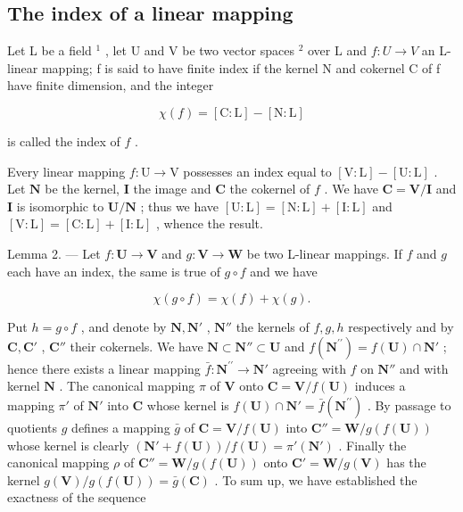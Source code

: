 \subsection{The index of a linear mapping}

Let L be a field \(^{1}\) , let U and V be two vector spaces \(^{2}\) over L and \(f: U \to V\) an L-linear mapping; f is said to have finite index if the kernel N and cokernel C of f have finite dimension, and the integer

\[
\chi (f) = [ \mathrm{C}: \mathrm{L} ] - [ \mathrm{N}: \mathrm{L} ]
\]

is called the index of \(f\) .

Every linear mapping \(f: \mathrm{U} \to \mathrm{V}\) possesses an index equal to \([\mathrm{V}: \mathrm{L}] - [\mathrm{U}: \mathrm{L}]\) . Let \(\mathbf{N}\) be the kernel, \(\mathbf{I}\) the image and \(\mathbf{C}\) the cokernel of \(f\) . We have \(\mathbf{C} = \mathbf{V} / \mathbf{I}\) and \(\mathbf{I}\) is isomorphic to \(\mathbf{U} / \mathbf{N}\) ; thus we have \([\mathrm{U}: \mathrm{L}] = [\mathrm{N}: \mathrm{L}] + [\mathrm{I}: \mathrm{L}]\) and \([\mathrm{V}: \mathrm{L}] = [\mathrm{C}: \mathrm{L}] + [\mathrm{I}: \mathrm{L}]\) , whence the result.

Lemma 2. --- Let \(f: \mathbf{U} \to \mathbf{V}\) and \(g: \mathbf{V} \to \mathbf{W}\) be two L-linear mappings. If \(f\) and \(g\) each have an index, the same is true of \(g \circ f\) and we have

\[
\chi (g \circ f) = \chi (f) + \chi (g).
\]

Put \(h = g \circ f\) , and denote by \(\mathbf{N}, \mathbf{N}'\) , \(\mathbf{N}''\) the kernels of \(f, g, h\) respectively and by \(\mathbf{C}, \mathbf{C}'\) , \(\mathbf{C}''\) their cokernels. We have \(\mathbf{N} \subset \mathbf{N}'' \subset \mathbf{U}\) and \(f(\mathbf{N}^{\prime\prime}) = f(\mathbf{U}) \cap \mathbf{N}'\) ; hence there exists a linear mapping \(\bar{f}: \mathbf{N}^{\prime\prime} \to \mathbf{N}'\) agreeing with \(f\) on \(\mathbf{N}''\) and with kernel \(\mathbf{N}\) . The canonical mapping \(\pi\) of \(\mathbf{V}\) onto \(\mathbf{C} = \mathbf{V}/f(\mathbf{U})\) induces a mapping \(\pi'\) of \(\mathbf{N}'\) into \(\mathbf{C}\) whose kernel is \(f(\mathbf{U}) \cap \mathbf{N}' = \bar{f}(\mathbf{N}^{\prime\prime})\) . By passage to quotients \(g\) defines a mapping \(\bar{g}\) of \(\mathbf{C} = \mathbf{V}/f(\mathbf{U})\) into \(\mathbf{C}'' = \mathbf{W}/g(f(\mathbf{U}))\) whose kernel is clearly \((\mathbf{N}' + f(\mathbf{U}))/f(\mathbf{U}) = \pi'(\mathbf{N}')\) . Finally the canonical mapping \(\rho\) of \(\mathbf{C}'' = \mathbf{W}/g(f(\mathbf{U}))\) onto \(\mathbf{C}' = \mathbf{W}/g(\mathbf{V})\) has the kernel \(g(\mathbf{V})/g(f(\mathbf{U})) = \bar{g}(\mathbf{C})\) . To sum up, we have established the exactness of the sequence

